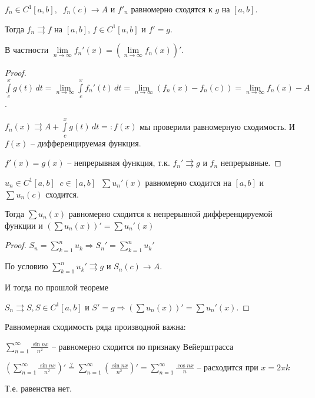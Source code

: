 
\begin{theorem}\slashns
    
    $f_n \in C^1[a,b], \;\; f_n(c) \to A$ и $f'_n$  равномерно сходятся к $g$ на $[a, b]$.
    
    Тогда $f_n \rightrightarrows f$ на $[a, b]$, $f \in C^1[a,b]$ и $f' = g$.
    
    В частности $\lim\limits_{n \to \infty} f_n'(x) = (\lim\limits_{n \to \infty} f_n(x))'$.
\end{theorem}

\begin{proof}\slashns
    
    $\int\limits_c^x g(t)\,dt = \lim\limits_{n \to \infty} \int\limits_c^x f_n'(t) \, dt = \lim\limits_{n \to \infty} (f_n(x) - f_n(c)) = \lim\limits_{n \to \infty} f_n(x) - A$.
    
    $f_n(x) \rightrightarrows A + \int\limits_c^x g(t)\,dt =: f(x)$ мы проверили равномерную сходимость. И $f(x)$ -- дифференцируемая функция.
    
    $f'(x) = g(x)$ -- непрерывная функция, т.к. $f_n' \rightrightarrows g$ и $f_n$ непрерывные.
\end{proof}

\begin{consequence}\slashns
    
    $u_n \in C^1[a,b] \;\; c \in [a,b] \;\; \sum u_n'(x)$ равномерно сходится на $[a, b]$ и $\sum u_n(c)$ сходится.
    
    Тогда $\sum u_n(x)$ равномерно сходится к непрерывной дифференцируемой функции и $\left( \sum u_n(x) \right)' = \sum u_n'(x)$
    
\end{consequence}

\begin{proof}\slashns
    
    $S_n = \sum\limits_{k = 1}^{n} u_k \Rightarrow S_n' = \sum\limits_{k = 1}^{n} u_k'$
    
    По условию $\sum\limits_{k = 1}^{n} u_k' \rightrightarrows g$ и $S_n(c) \to A$.
    
    И тогда по прошлой теореме 
    
    $S_n \rightrightarrows S, S \in C^1[a,b]$ и $S' = g \Rightarrow \left( \sum u_n(x) \right)' = \sum u_n'(x)$.
\end{proof}

\begin{example}\slashns
    
    
    Равномерная сходимость ряда производной важна:
    
    $\sum\limits_{n=1}^{\infty} \frac{\sin n x}{n^2}$ -- равномерно сходится по признаку Вейерштрасса
    
    $(\sum\limits_{n=1}^{\infty} \frac{\sin n x}{n^2})' \stackrel{?}{=} \sum\limits_{n=1}^{\infty} (\frac{\sin n x}{n^2})' = \sum\limits_{n= 1}^{\infty} \frac{\cos nx}{n}$ -- расходится при $x=2\pi k$
    
    Т.е. равенства нет.
\end{example}

